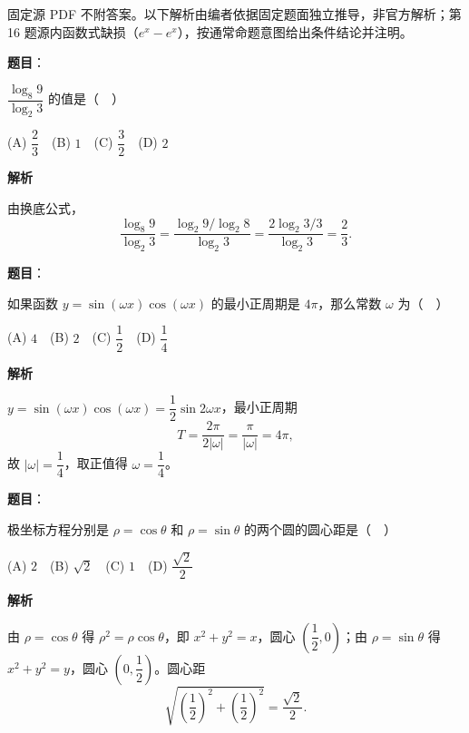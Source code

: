 

\begin{gktip}
固定源 PDF 不附答案。以下解析由编者依据固定题面独立推导，非官方解析；第 16 题源内函数式缺损（\(e^x-e^x\)），按通常命题意图给出条件结论并注明。
\end{gktip}

\begin{answer}

\textbf{题目}：

\(\dfrac{\log_8 9}{\log_2 3}\) 的值是（　）

(A) \(\dfrac{2}{3}\)　(B) \(1\)　(C) \(\dfrac{3}{2}\)　(D) \(2\)

\textbf{解析}

由换底公式，
\nopagebreak[4]
\[
\frac{\log_8 9}{\log_2 3}
=\frac{\log_2 9/\log_2 8}{\log_2 3}
=\frac{2\log_2 3/3}{\log_2 3}
=\frac23.
\]


\end{answer}
\begin{answer}

\textbf{题目}：

如果函数 \(y=\sin(\omega x)\cos(\omega x)\) 的最小正周期是 \(4\pi\)，那么常数 \(\omega\) 为（　）

(A) \(4\)　(B) \(2\)　(C) \(\dfrac{1}{2}\)　(D) \(\dfrac{1}{4}\)

\textbf{解析}

\(y=\sin(\omega x)\cos(\omega x)=\dfrac12\sin 2\omega x\)，最小正周期
\nopagebreak[4]
\[
T=\frac{2\pi}{2|\omega|}=\frac{\pi}{|\omega|}=4\pi,
\]
故 \(|\omega|=\dfrac14\)，取正值得 \(\omega=\dfrac14\)。


\end{answer}
\begin{answer}

\textbf{题目}：

极坐标方程分别是 \(\rho=\cos\theta\) 和 \(\rho=\sin\theta\) 的两个圆的圆心距是（　）

(A) \(2\)　(B) \(\sqrt{2}\)　(C) \(1\)　(D) \(\dfrac{\sqrt{2}}{2}\)

\textbf{解析}

由 \(\rho=\cos\theta\) 得 \(\rho^2=\rho\cos\theta\)，即 \(x^2+y^2=x\)，圆心 \(\left(\dfrac12,0\right)\)；由 \(\rho=\sin\theta\) 得 \(x^2+y^2=y\)，圆心 \(\left(0,\dfrac12\right)\)。圆心距
\nopagebreak[4]
\[
\sqrt{\left(\frac12\right)^2+\left(\frac12\right)^2}=\frac{\sqrt2}{2}.
\]


\end{answer}

